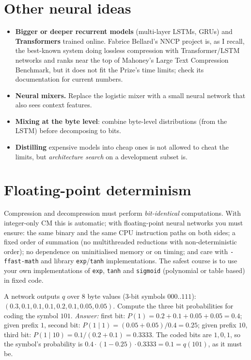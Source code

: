 \documentclass[11pt,a4paper,openany]{book}
\newcommand{\code}[1]{\texttt{#1}}
\theoremstyle{definition}
\theoremstyle{remark}
\begin{document}
\section{Other neural ideas}

\begin{itemize}
\item \textbf{Bigger or deeper recurrent models} (multi-layer LSTMs, GRUs) and \textbf{Transformers} trained online. Fabrice Bellard's NNCP project is, as I recall, the best-known system doing lossless compression with Transformer/LSTM networks and ranks near the top of Mahoney's Large Text Compression Benchmark, but it does not fit the Prize's time limits; check its documentation for current numbers.
\item \textbf{Neural mixers.} Replace the logistic mixer with a small neural network that also sees context features.
\item \textbf{Mixing at the byte level}: combine byte-level distributions (from the LSTM) before decomposing to bits.
\item \textbf{Distilling} expensive models into cheap ones is not allowed to cheat the limits, but \emph{architecture search} on a development subset is.
\end{itemize}

\section{Floating-point determinism}

Compression and decompression must perform \emph{bit-identical} computations. With integer-only CM this is automatic; with floating-point neural networks you must ensure: the same binary and the same CPU instruction paths on both sides; a fixed order of summation (no multithreaded reductions with non-deterministic order); no dependence on uninitialised memory or on timing; and care with \code{-ffast-math} and library \code{exp}/\code{tanh} implementations. The safest course is to use your own implementations of \code{exp}, \code{tanh} and \code{sigmoid} (polynomial or table based) in fixed code.

\begin{exercise}
A network outputs $q$ over 8 byte values (3-bit symbols $000..111$): $(0.3,0.1,0.1,0.1,0.2,0.1,0.05,0.05)$. Compute the three bit probabilities for coding the symbol $101$. \emph{Answer:} first bit: $P(1)=0.2+0.1+0.05+0.05=0.4$; given prefix $1$, second bit: $P(1\mid1)=(0.05+0.05)/0.4=0.25$; given prefix $10$, third bit: $P(1\mid10)=0.1/(0.2+0.1)=0.3333$. The coded bits are $1,0,1$, so the symbol's probability is $0.4\cdot(1-0.25)\cdot0.3333=0.1=q(101)$, as it must be.
\end{exercise}
\end{document}
